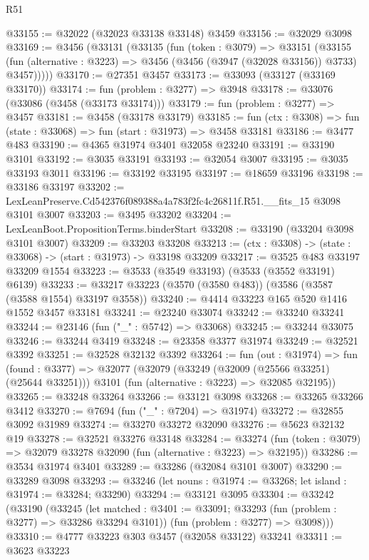 \begin{lexlean}{R51}
\begin{coremodule}
@33155 := @32022 (@32023 @33138 @33148) @3459
@33156 := @32029 @3098
@33169 := @3456
    (@33131
      (@33135
        (fun (token : @3079) =>
        @33151
          (@33155
            (fun (alternative : @3223) => @3456 (@3456 (@3947 (@32028 @33156)) @3733) @3457)))))
@33170 := @27351 @3457
@33173 := @33093 (@33127 (@33169 @33170))
@33174 := fun (problem : @3277) => @3948
@33178 := @33076 (@33086 (@3458 (@33173 @33174)))
@33179 := fun (problem : @3277) => @3457
@33181 := @3458 (@33178 @33179)
@33185 := fun (ctx : @3308) => fun (state : @33068) => fun (start : @31973) => @3458 @33181
@33186 := @3477 @483
@33190 := @4365 @31974 @3401 @32058 @23240
@33191 := @33190 @3101
@33192 := @3035 @33191
@33193 := @32054 @3007
@33195 := @3035 @33193 @3011
@33196 := @33192 @33195
@33197 := @18659 @33196
@33198 := @33186 @33197
@33202 := LexLeanPreserve.Cd542376f089388a4a783f2fc4c26811f.R51.__fits_15 @3098 @3101 @3007
@33203 := @3495 @33202
@33204 := LexLeanBoot.PropositionTerms.binderStart
@33208 := @33190 (@33204 @3098 @3101 @3007)
@33209 := @33203 @33208
@33213 := (ctx : @3308) -> (state : @33068) -> (start : @31973) -> @33198 @33209
@33217 := @3525 @483 @33197 @33209 @1554
@33223 := @3533 (@3549 @33193) (@3533 (@3552 @33191) @6139)
@33233 := @33217 @33223 (@3570 (@3580 @483)) (@3586 (@3587 (@3588 @1554) @33197 @3558))
@33240 := @4414 @33223 @165 @520 @1416 @1552 @3457 @33181
@33241 := @23240 @33074
@33242 := @33240 @33241
@33244 := @23146 (fun ("_" : @5742) => @33068)
@33245 := @33244 @33075
@33246 := @33244 @3419
@33248 := @23358 @3377 @31974
@33249 := @32521 @3392
@33251 := @32528 @32132 @3392
@33264 := fun (out : @31974) =>
  fun (found : @3377) =>
  @32077
    (@32079
      (@33249 (@32009 (@25566 @33251) (@25644 @33251)))
      @3101
      (fun (alternative : @3223) => @32085 @32195))
@33265 := @33248 @33264
@33266 := @33121 @3098
@33268 := @33265 @33266 @3412
@33270 := @7694 (fun ("_" : @7204) => @31974)
@33272 := @32855 @3092 @31989
@33274 := @33270 @33272 @32090
@33276 := @5623 @32132 @19
@33278 := @32521 @33276 @33148
@33284 := @33274 (fun (token : @3079) => @32079 @33278 @32090 (fun (alternative : @3223) => @32195))
@33286 := @3534 @31974 @3401
@33289 := @33286 (@32084 @3101 @3007)
@33290 := @33289 @3098
@33293 := @33246 (let nouns : @31974 := @33268; let island : @31974 := @33284; @33290)
@33294 := @33121 @3095
@33304 := @33242
    (@33190
      (@33245
        (let matched : @3401 := @33091; @33293 (fun (problem : @3277) => @33286 @33294 @3101))
        (fun (problem : @3277) => @3098)))
@33310 := @4777 @33223 @303 @3457 (@32058 @33122) @33241
@33311 := @3623 @33223

\end{coremodule}
\end{lexlean}

